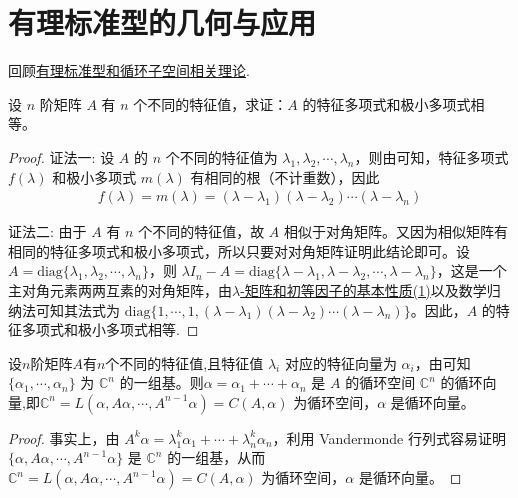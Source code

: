 \documentclass[../../main.tex]{subfiles}%
\begin{document}
\section{有理标准型的几何与应用}

回顾\hyperref[section:有理标准型]{有理标准型和循环子空间相关理论}.

\begin{proposition}\label{proposition:矩阵有不同特征值则特征多项式和极小多项式一定相等}
设 $n$ 阶矩阵 $A$ 有 $n$ 个不同的特征值，求证：$A$ 的特征多项式和极小多项式相等。
\end{proposition}
\begin{proof}

{\color{blue}证法一:}
设 $A$ 的 $n$ 个不同的特征值为 $\lambda_1,\lambda_2,\cdots,\lambda_n$，则由可知，特征多项式 $f(\lambda)$ 和极小多项式 $m(\lambda)$ 有相同的根（不计重数），因此 
\begin{align*}
f(\lambda)=m(\lambda)=(\lambda - \lambda_1)(\lambda - \lambda_2)\cdots(\lambda - \lambda_n)
\end{align*}

{\color{blue}证法二:}
由于 $A$ 有 $n$ 个不同的特征值，故 $A$ 相似于对角矩阵。又因为相似矩阵有相同的特征多项式和极小多项式，所以只要对对角矩阵证明此结论即可。设 $A = \mathrm{diag}\{\lambda_1,\lambda_2,\cdots,\lambda_n\}$，则 $\lambda I_n - A = \mathrm{diag}\{\lambda - \lambda_1,\lambda - \lambda_2,\cdots,\lambda - \lambda_n\}$，这是一个主对角元素两两互素的对角矩阵，由\hyperref[theorem:lambda-矩阵和初等因子的基本性质]{$\lambda$-矩阵和初等因子的基本性质(1)}以及数学归纳法可知其法式为 $\mathrm{diag}\{1,\cdots,1,(\lambda - \lambda_1)(\lambda - \lambda_2)\cdots(\lambda - \lambda_n)\}$。因此，$A$ 的特征多项式和极小多项式相等.
\end{proof}

\begin{proposition}\label{proposition:不同特征值对应的特征向量之和恰好构成循环向量}
设$n$阶矩阵$A$有$n$个不同的特征值,且特征值 $\lambda_i$ 对应的特征向量为 $\alpha_i$，由可知$\{\alpha_1,\cdots,\alpha_n\}$ 为 $\mathbb{C}^n$ 的一组基。则$\alpha = \alpha_1 + \cdots + \alpha_n$ 是 $A$ 的循环空间 $\mathbb{C}^n$ 的循环向量,即$\mathbb{C}^n = L(\alpha,A\alpha,\cdots,A^{n - 1}\alpha)=C(A,\alpha)$ 为循环空间，$\alpha$ 是循环向量。
\end{proposition}
\begin{proof}
事实上，由 $A^k\alpha = \lambda_1^k\alpha_1 + \cdots + \lambda_n^k\alpha_n$，利用 Vandermonde 行列式容易证明 $\{\alpha,A\alpha,\cdots,A^{n - 1}\alpha\}$ 是 $\mathbb{C}^n$ 的一组基，从而 $\mathbb{C}^n = L(\alpha,A\alpha,\cdots,A^{n - 1}\alpha)=C(A,\alpha)$ 为循环空间，$\alpha$ 是循环向量。
\end{proof}
\end{document}
